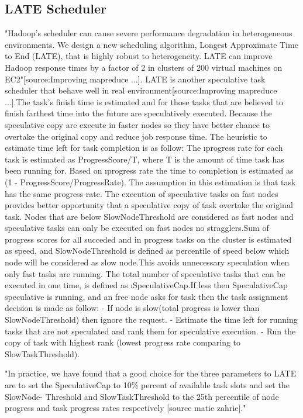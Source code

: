\subsection{LATE Scheduler}

"Hadoop’s scheduler can cause severe performance degradation in heterogeneous environments. We design a new scheduling algorithm, Longest Approximate Time to End (LATE), that is highly robust to heterogeneity. LATE can improve Hadoop response times by a factor of 2 in clusters of 200 virtual machines on EC2"[source:Improving mapreduce ...].
LATE is another speculative task scheduler that behave well in real environment[source:Improving mapreduce ...].The task's finish time is estimated and for those tasks that are believed to finish farthest time into the future are speculatively executed. Because the speculative copy are execute in faster nodes so they have better chance to overtake the original copy and reduce job response time. 
The heuristic to estimate time left for task completion is as follow: The \i{progress rate} for each task is estimated as  ProgressScore/T, where T is the amount of time task has been running for. Based on \i{progress rate} the time to completion is estimated as (1 - ProgressScore/ProgressRate). The assumption in this estimation is that task has the same progress rate.
The execution of speculative tasks on fast nodes provides better opportunity that a speculative copy of task overtake the original task. Nodes that are below SlowNodeThreshold are considered as fast nodes and speculative tasks can only be executed on fast nodes no stragglers.Sum of progress scores for all succeded and in progress tasks on the cluster is estimated as speed, and SlowNodeThreshold is defined as percentile of speed below which node will be considered as slow node.This avoids unnecessary speculation when only fast tasks are running.  
The total number of speculative tasks that can be executed in one time, is defined as \i{SpeculativeCap}.If less then SpeculativeCap speculative is running, and an free node asks for task then the task assignment decision is made as follow:
 - If node is slow(total progress is lower than SlowNodeThreshold) then ignore the request. 
 - Estimate the time left for running tasks that are not speculated and rank them for speculative execution. 
 - Run the copy of task with highest rank (lowest progress rate comparing to SlowTaskThreshold). 
 
"In practice, we have found that a good choice for the three parameters to LATE are to set the SpeculativeCap to 10\% percent of available task slots and set the SlowNode- Threshold and SlowTaskThreshold to the 25th percentile of node progress and task progress rates respectively [source matie zahrie]."
 
